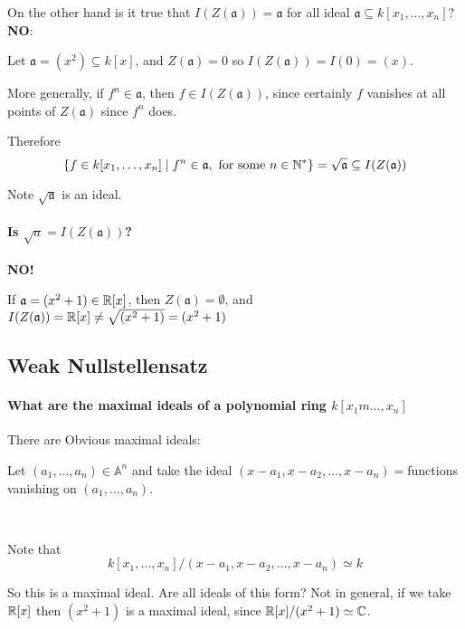 On the other hand is it true that $I(Z(\mathfrak{a})) = \mathfrak{a}$ for all ideal $\mathfrak{a}\subseteq k[x_1,\dots,x_n]$? \textbf{NO}:\begin{example}
    Let $\mathfrak{a} = (x^2)\subseteq k[x]$, and $Z(\mathfrak{a}) = 0$ so $I(Z(\mathfrak{a})) = I(0) = (x)$.
\end{example}

More generally, if $f^n\in \mathfrak{a}$, then $f\in I(Z(\mathfrak{a}))$, since certainly $f$ vanishes at all points of $Z(\mathfrak{a})$ since $f^n$ does.

Therefore \begin{equation*}
    \{f\in k[x_1,\dots,x_n]\mid f^n\in \mathfrak{a}, \text{ for some }n\in\mathbb{N}^\ast\} = \sqrt{\mathfrak{a}} \subseteq I(Z(\mathfrak{a}))
\end{equation*}

Note $\sqrt{\mathfrak{a}}$ is an ideal.


\paragraph*{Is $\sqrt{a} = I(Z(\mathfrak{a}))$?}

\textbf{NO!}

\begin{example}
    If $\mathfrak{a} = (x^2+1)\in \mathbb{R}[x]$, then $Z(\mathfrak{a}) = \emptyset$, and $I(Z(\mathfrak{a})) = \mathbb{R}[x] \neq \sqrt{(x^2+1)} = (x^2+1)$
\end{example}

\subsection{Weak Nullstellensatz}
\paragraph*{What are the maximal ideals of a polynomial ring $k[x_1m\dots,x_n]$}

There are Obvious maximal ideals:

Let $(a_1,\dots,a_n)\in \mathbb{A}^n$ and take the ideal $(x-a_1,x-a_2,\dots,x-a_n) = $functions vanishing on $(a_1,\dots,a_n)$.

\

Note that \begin{equation*}
    k[x_1,\dots,x_n]/(x-a_1,x-a_2,\dots,x-a_n) \simeq k
\end{equation*}

So this is a maximal ideal. Are all ideals of this form? Not in general, if we take $\mathbb{R}[x]$ then $(x^2+1)$ is a maximal ideal, since $\mathbb{R}[x]/(x^2+1) \simeq \mathbb{C}$.

